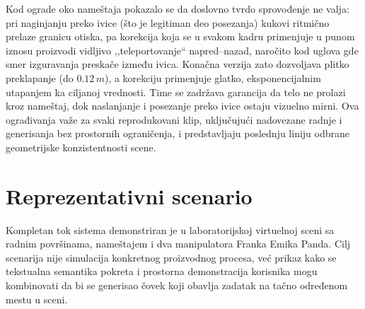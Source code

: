 \documentclass{article}
\begin{document}
Kod ograde oko nameštaja pokazalo se da doslovno tvrdo sprovođenje ne valja: pri naginjanju preko ivice (što je legitiman deo posezanja) kukovi ritmično prelaze granicu otiska, pa korekcija koja se u svakom kadru primenjuje u punom iznosu proizvodi vidljivo ,,teleportovanje`` napred--nazad, naročito kod uglova gde smer izguravanja preskače između ivica. Konačna verzija zato dozvoljava plitko preklapanje (do $0.12\,m$), a korekciju primenjuje glatko, eksponencijalnim utapanjem ka ciljanoj vrednosti. Time se zadržava garancija da telo ne prolazi kroz nameštaj, dok naslanjanje i posezanje preko ivice ostaju vizuelno mirni. Ova ograđivanja važe za svaki reprodukovani klip, uključujući nadovezane radnje i generisanja bez prostornih ograničenja, i predstavljaju poslednju liniju odbrane geometrijske konzistentnosti scene.


\section{Reprezentativni scenario}
\label{sec:scenario}

Kompletan tok sistema demonstriran je u laboratorijskoj virtuelnoj sceni sa radnim površinama, nameštajem i dva manipulatora Franka Emika Panda. Cilj scenarija nije simulacija konkretnog proizvodnog procesa, već prikaz kako se tekstualna semantika pokreta i prostorna demonstracija korisnika mogu kombinovati da bi se generisao čovek koji obavlja zadatak na tačno određenom mestu u sceni.
\end{document}
